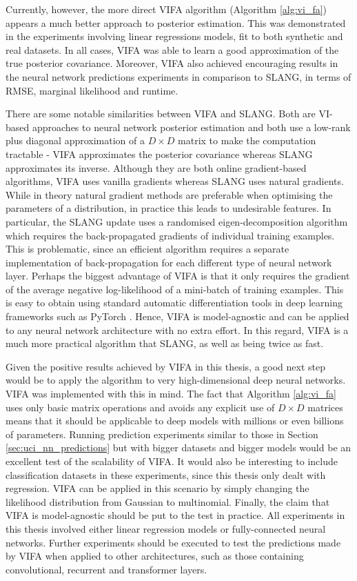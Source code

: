 \documentclass[msc,deptreport.inf]{infthesis} %
\begin{document}
Currently, however, the more direct VIFA algorithm (Algorithm \ref{alg:vi_fa}) appears a much better approach to posterior estimation. This was demonstrated in the experiments involving linear regressions models, fit to both synthetic and real datasets. In all cases, VIFA was able to learn a good approximation of the true posterior covariance. Moreover, VIFA also achieved encouraging results in the neural network predictions experiments in comparison to SLANG, in terms of RMSE, marginal likelihood and runtime. 

There are some notable similarities between VIFA and SLANG. Both are VI-based approaches to neural network posterior estimation and both use a low-rank plus diagonal approximation of a $D \times D$ matrix to make the computation tractable - VIFA approximates the posterior covariance whereas SLANG approximates its inverse. Although they are both online gradient-based algorithms, VIFA uses vanilla gradients whereas SLANG uses natural gradients. While in theory natural gradient methods are preferable when optimising the parameters of a distribution, in practice this leads to undesirable features. In particular, the SLANG update uses a randomised eigen-decomposition algorithm which requires the back-propagated gradients of individual training examples. This is problematic, since an efficient algorithm requires a separate implementation of back-propagation for each different type of neural network layer. Perhaps the biggest advantage of VIFA is that it only requires the gradient of the average negative log-likelihood of a mini-batch of training examples. This is easy to obtain using standard automatic differentiation tools in deep learning frameworks such as PyTorch \cite{paszke2019}. Hence, VIFA is model-agnostic and can be applied to any neural network architecture with no extra effort. In this regard, VIFA is a much more practical algorithm that SLANG, as well as being twice as fast.

Given the positive results achieved by VIFA in this thesis, a good next step would be to apply the algorithm to very high-dimensional deep neural networks. VIFA was implemented with this in mind. The fact that Algorithm \ref{alg:vi_fa} uses only basic matrix operations and avoids any explicit use of $D \times D$ matrices means that it should be applicable to deep models with millions or even billions of parameters. Running prediction experiments similar to those in Section \ref{sec:uci_nn_predictions} but with bigger datasets and bigger models would be an excellent test of the scalability of VIFA. It would also be interesting to include classification datasets in these experiments, since this thesis only dealt with regression. VIFA can be applied in this scenario by simply changing the likelihood distribution from Gaussian to multinomial. Finally, the claim that VIFA is model-agnostic should be put to the test in practice. All experiments in this thesis involved either linear regression models or fully-connected neural networks. Further experiments should be executed to test the predictions made by VIFA when applied to other architectures, such as those containing convolutional, recurrent and transformer layers.
\end{document}
